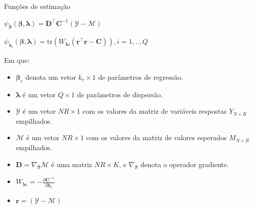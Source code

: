\documentclass[
  ignorenonframetext,
  serif,
  professionalfont,
  usenames,
  dvipsnames,
  aspectratio = 169]{beamer}
\begin{document}
\begin{frame}{Funções de estimação}
\protect\hypertarget{funuxe7uxf5es-de-estimauxe7uxe3o}{}
\begin{center}
$\psi_{\boldsymbol{\beta}}(\boldsymbol{\beta}, \boldsymbol{\lambda}) = \boldsymbol{D}^\top \boldsymbol{C}^{-1}(\mathcal{Y} - \mathcal{M})$

$\psi_{\boldsymbol{\lambda}_i}(\boldsymbol{\beta}, \boldsymbol{\lambda}) = \mathrm{tr}(W_{\boldsymbol{\lambda}i} (\boldsymbol{r}^\top\boldsymbol{r} - \boldsymbol{C})),  i = 1,.., Q$
\end{center}

Em que:

\begin{itemize}
  
  \item \normalsize $\boldsymbol{\beta}_r$ denota um vetor $k_r \times 1$ de parâmetros de regressão.
  
  \item \normalsize $\boldsymbol{\lambda}$ é um vetor $Q \times 1$ de parâmetros de dispersão.
  
  \item \normalsize $\mathcal{Y}$ é um vetor $NR \times 1$ com os valores da matriz de variáveis respostas $Y_{N \times R}$ empilhados.
  
  \item \normalsize $\mathcal{M}$ é um vetor $NR \times 1$ com os valores da matriz de valores esperados $M_{N \times R}$ empilhados.
  
  \item \normalsize $\boldsymbol{D} = \nabla_{\boldsymbol{\beta}} \mathcal{M}$ 
é uma matriz $NR \times K$, e $\nabla_{\boldsymbol{\beta}}$ denota o 
operador gradiente.
  
  \item \normalsize $W_{\boldsymbol{\lambda}i} = -\frac{\partial
    \boldsymbol{C}^{-1}}{\partial \boldsymbol{\lambda}_i}$ 
    
  \item \normalsize $\boldsymbol{r} = (\mathcal{Y} - \mathcal{M})$
  
\end{itemize}
\end{frame}
\end{document}
